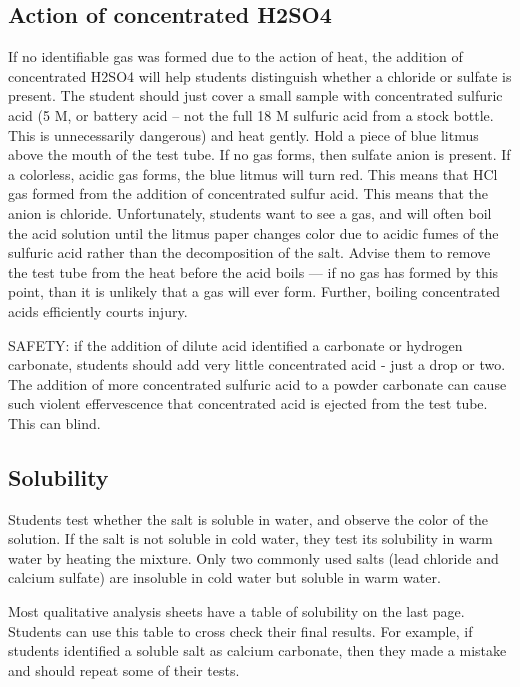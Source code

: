 \subsection{Action of concentrated H2SO4}
If no identifiable gas was formed due to the action of heat, 
the addition of concentrated H2SO4 will help students 
distinguish whether a chloride or sulfate is present. 
The student should just cover a small sample 
with concentrated sulfuric acid (5 M, 
or battery acid – not the full 18 M sulfuric acid from a stock bottle. 
This is unnecessarily dangerous) and heat gently. 
Hold a piece of blue litmus above the mouth of the test tube. 
If no gas forms, 
then sulfate anion is present. 
If a colorless, 
acidic gas forms, 
the blue litmus will turn red. 
This means that HCl gas formed from the addition of concentrated sulfur acid. 
This means that the anion is chloride. 
Unfortunately, 
students want to see a gas, 
and will often boil the acid solution 
until the litmus paper changes color due to 
acidic fumes of the sulfuric acid rather than the decomposition of the salt. 
Advise them to remove the test tube from the heat before the acid boils — 
if no gas has formed by this point, 
than it is unlikely that a gas will ever form. 
Further, 
boiling concentrated acids efficiently courts injury.

SAFETY: if the addition of dilute acid identified 
a carbonate or hydrogen carbonate, 
students should add very little concentrated acid - 
just a drop or two. 
The addition of more concentrated sulfuric acid 
to a powder carbonate can cause such violent effervescence 
that concentrated acid is ejected from the test tube. 
This can blind.

\subsection{Solubility}
Students test whether the salt is soluble in water, 
and observe the color of the solution. 
If the salt is not soluble in cold water, 
they test its solubility in warm water by heating the mixture. 
Only two commonly used salts 
(lead chloride and calcium sulfate) are insoluble in cold water 
but soluble in warm water. 

Most qualitative analysis sheets have a table of solubility on the last page. 
Students can use this table to cross check their final results. 
For example, 
if students identified a soluble salt as calcium carbonate, 
then they made a mistake and should repeat some of their tests.

